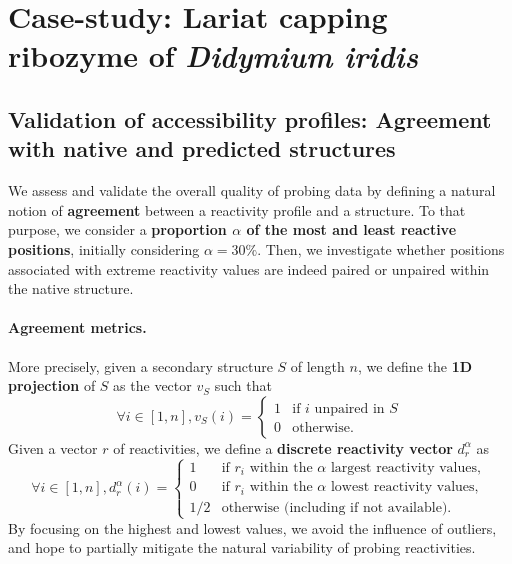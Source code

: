 \documentclass[11pt]{article} %
\begin{document}




\newpage
\section{Case-study: Lariat capping ribozyme of {\itshape Didymium iridis}}
\subsection{Validation of accessibility profiles: Agreement with native and predicted structures}
We assess and validate the overall quality of probing data by defining a natural notion of {\bf agreement} between a reactivity profile and a structure. To that purpose, we consider a {\bf proportion $\alpha$ of the most and least reactive positions}, initially considering $\alpha=30\%$. Then, we investigate whether positions associated with extreme reactivity values are indeed paired or unpaired within the native structure.

\paragraph{Agreement metrics.}More precisely, given a secondary structure $S$ of length $n$, we define the {\bf 1D projection} of $S$ as the vector $v_S$ such that
$$ \forall i\in[1,n], v_S(i)=\begin{cases} 1 &\text{if $i$ unpaired in $S$}\\ 0 &\text{otherwise.} \end{cases} $$
Given a vector $r$ of reactivities, we define a {\bf discrete reactivity vector} $d_{r}^{\alpha}$ as
$$ \forall i\in[1,n], d_{r}^{\alpha}(i)=\begin{cases} 1 &\text{if $r_i$ within the $\alpha$ largest reactivity values},\\ 
0 & \text{if $r_i$ within the $\alpha$ lowest reactivity values},\\
1/2 &\text{otherwise (including if not available).} \end{cases} $$
By focusing on the highest and lowest values, we avoid the influence of outliers, and hope to partially mitigate the natural variability of probing reactivities.
\end{document}
